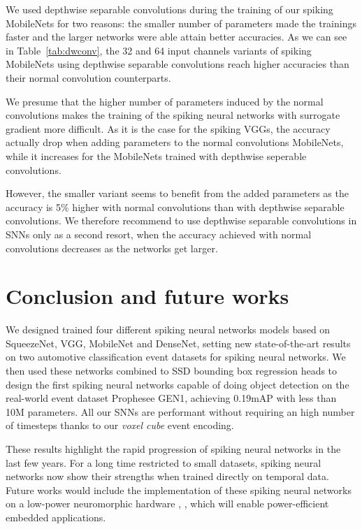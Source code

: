 \documentclass[conference]{IEEEtran}
\begin{document}
We used depthwise separable convolutions during the training of our spiking MobileNets for two reasons: the smaller number of parameters made the trainings faster and the larger networks were able attain better accuracies. As we can see in Table~\ref{tab:dwconv}, the 32 and 64 input channels variants of spiking MobileNets using depthwise separable convolutions reach higher accuracies than their normal convolution counterparts. 

We presume that the higher number of parameters induced by the normal convolutions makes the training of the spiking neural networks with surrogate gradient more difficult. As it is the case for the spiking VGGs, the accuracy actually drop when adding parameters to the normal convolutions MobileNets, while it increases for the MobileNets trained with depthwise seperable convolutions.

However, the smaller variant seems to benefit from the added parameters as the accuracy is 5\% higher with normal convolutions than with depthwise separable convolutions. We therefore recommend to use depthwise separable convolutions in SNNs only as a second resort, when the accuracy achieved with normal convolutions decreases as the networks get larger.

\section{Conclusion and future works}
We designed trained four different spiking neural networks models based on SqueezeNet, VGG, MobileNet and DenseNet, setting new state-of-the-art results on two automotive classification event datasets for spiking neural networks. We then used these networks combined to SSD bounding box regression heads to design the first spiking neural networks capable of doing object detection on the real-world event dataset Prophesee GEN1, achieving 0.19mAP with less than 10M parameters. All our SNNs are performant without requiring an high number of timesteps thanks to our \textit{voxel cube} event encoding. 

These results highlight the rapid progression of spiking neural networks in the last few years. For a long time restricted to small datasets, spiking neural networks now show their strengths when trained directly on temporal data. Future works would include the implementation of these spiking neural networks on a low-power neuromorphic hardware \cite{nassim}, \cite{loihi2}, which will enable power-efficient embedded applications.
\end{document}
